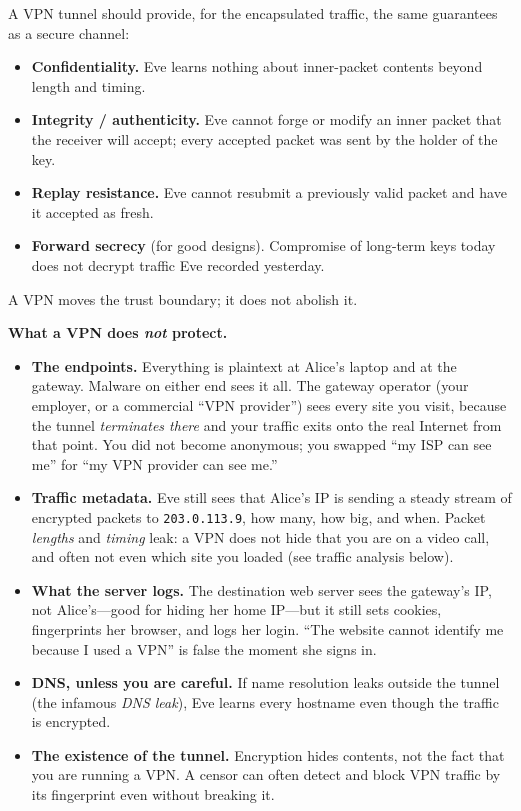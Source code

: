 \begin{formalbox}
A VPN tunnel should provide, for the encapsulated traffic, the same guarantees as a secure channel:
\begin{itemize}
\item \textbf{Confidentiality.} Eve learns nothing about inner-packet contents beyond length and timing.
\item \textbf{Integrity / authenticity.} Eve cannot forge or modify an inner packet that the receiver will accept; every accepted packet was sent by the holder of the key.
\item \textbf{Replay resistance.} Eve cannot resubmit a previously valid packet and have it accepted as fresh.
\item \textbf{Forward secrecy} (for good designs). Compromise of long-term keys today does not decrypt traffic Eve recorded yesterday.
\end{itemize}
\end{formalbox}

A VPN moves the trust boundary; it does not abolish it.

\begin{trapbox}
\textbf{What a VPN does \emph{not} protect.}
\begin{itemize}
\item \textbf{The endpoints.} Everything is plaintext at Alice's laptop and at the gateway. Malware on either end sees it all. The gateway operator (your employer, or a commercial ``VPN provider'') sees every site you visit, because the tunnel \emph{terminates there} and your traffic exits onto the real Internet from that point. You did not become anonymous; you swapped ``my ISP can see me'' for ``my VPN provider can see me.''
\item \textbf{Traffic metadata.} Eve still sees that Alice's IP is sending a steady stream of encrypted packets to \texttt{203.0.113.9}, how many, how big, and when. Packet \emph{lengths} and \emph{timing} leak: a VPN does not hide that you are on a video call, and often not even which site you loaded (see traffic analysis below).
\item \textbf{What the server logs.} The destination web server sees the gateway's IP, not Alice's---good for hiding her home IP---but it still sets cookies, fingerprints her browser, and logs her login. ``The website cannot identify me because I used a VPN'' is false the moment she signs in.
\item \textbf{DNS, unless you are careful.} If name resolution leaks outside the tunnel (the infamous \emph{DNS leak}), Eve learns every hostname even though the traffic is encrypted.
\item \textbf{The existence of the tunnel.} Encryption hides contents, not the fact that you are running a VPN. A censor can often detect and block VPN traffic by its fingerprint even without breaking it.
\end{itemize}
\end{trapbox}

